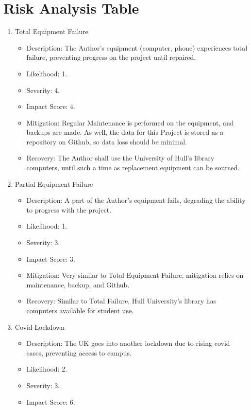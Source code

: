 \documentclass[11pt, a4paper, notitlepage]{report}
\begin{document}
\chapter{Risk Analysis Table}\label{app:RiskAnalysis}
\begin{enumerate}
    \item Total Equipment Failure
    \begin{itemize}
        \item Description: The Author's equipment (computer, phone) experiences total failure, preventing progress on the project until repaired.
        \item Likelihood: 1.
        \item Severity: 4.
        \item Impact Score: 4.
        \item Mitigation: Regular Maintenance is performed on the equipment, and backups are made. As well, the data for this Project is stored as a repository on Github, so data loss should be minimal.
        \item Recovery: The Author shall use the University of Hull's library computers, until such a time as replacement equipment can be sourced.
    \end{itemize}
    \item Partial Equipment Failure
    \begin{itemize}
        \item Description: A part of the Author's equipment fails, degrading the ability to progress with the project.
        \item Likelihood: 1.
        \item Severity: 3.
        \item Impact Score: 3.
        \item Mitigation: Very similar to Total Equipment Failure, mitigation relies on maintenance, backup, and Github.
        \item Recovery: Similar to Total Failure, Hull University's library has computers available for student use.
    \end{itemize}
    \item Covid Lockdown
    \begin{itemize}
        \item Description: The UK goes into another lockdown due to rising covid cases, preventing access to campus.
        \item Likelihood: 2.
        \item Severity: 3.
        \item Impact Score: 6.

\end{itemize}
\end{enumerate}
\end{document}
